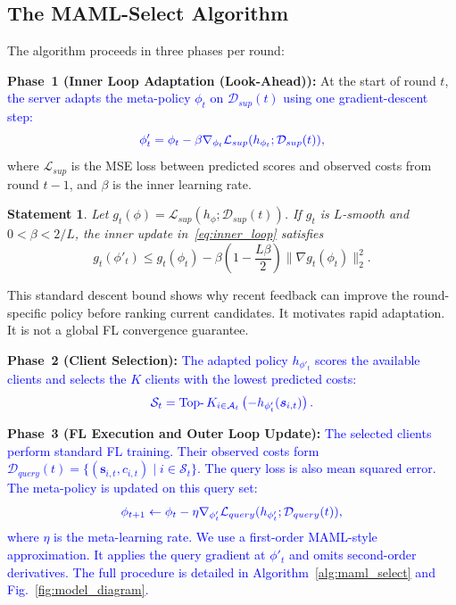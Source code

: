 \documentclass[journal]{IEEEtran}
\newtheorem{Statement}{Statement}
\newcommand{\revision}[1]{\textcolor{blue}{#1}}
\begin{document}
\subsection{The MAML-Select Algorithm}
The algorithm proceeds in three phases per round:

\textbf{Phase~1 (Inner Loop Adaptation (Look-Ahead)):}
At the start of round $t$, \revision{the server adapts the meta-policy $\phi_t$ on $\mathcal{D}_{sup}(t)$ using one gradient-descent step:}
\begin{equation}
	\color{blue}
		\phi'_t = \phi_t - \beta \nabla_{\phi_t} \mathcal{L}_{sup}(h_{\phi_t};\mathcal{D}_{sup}(t)),
		\label{eq:inner_loop}
\end{equation}
where $\mathcal{L}_{sup}$ is the MSE loss between predicted scores and observed costs from round $t-1$, and $\beta$ is the inner learning rate.

{\color{blue}
\begin{Statement}
Let $g_t(\phi)=\mathcal{L}_{sup}(h_\phi;\mathcal{D}_{sup}(t))$. If $g_t$ is $L$-smooth and $0<\beta<2/L$, the inner update in~\eqref{eq:inner_loop} satisfies
\[
g_t(\phi'_t) \leq g_t(\phi_t)
-\beta\left(1-\frac{L\beta}{2}\right)
\|\nabla g_t(\phi_t)\|_2^2.
\]
\end{Statement}
This standard descent bound shows why recent feedback can improve the round-specific policy before ranking current candidates. It motivates rapid adaptation. It is not a global FL convergence guarantee.
}

\textbf{Phase~2 (Client Selection):}
\revision{The adapted policy $h_{\phi'_t}$ scores the available clients and selects the $K$ clients with the lowest predicted costs:}
\begin{equation}
	\color{blue}
	\mathcal{S}_t = \operatorname{Top-}K_{i \in \mathcal{A}_t} \left( -h_{\phi'_t}(\bm{s}_{i,t}) \right).
	\label{eq:selection}
\end{equation}

\textbf{Phase~3 (FL Execution and Outer Loop Update):}
\revision{The selected clients perform standard FL training. Their observed costs form $\mathcal{D}_{query}(t)=\{(\bm{s}_{i,t},c_{i,t})\mid i\in\mathcal{S}_t\}$. The query loss is also mean squared error. The meta-policy is updated on this query set:}
\begin{equation}
		\color{blue}
		\phi_{t+1} \leftarrow \phi_t - \eta \nabla_{\phi'_t} \mathcal{L}_{query}(h_{\phi'_t}; \mathcal{D}_{query}(t)),
		\label{eq:outer_loop}
\end{equation}
\revision{where $\eta$ is the meta-learning rate. We use a first-order MAML-style approximation. It applies the query gradient at $\phi'_t$ and omits second-order derivatives. The full procedure is detailed in Algorithm~\ref{alg:maml_select} and Fig.~\ref{fig:model_diagram}.}
\end{document}
